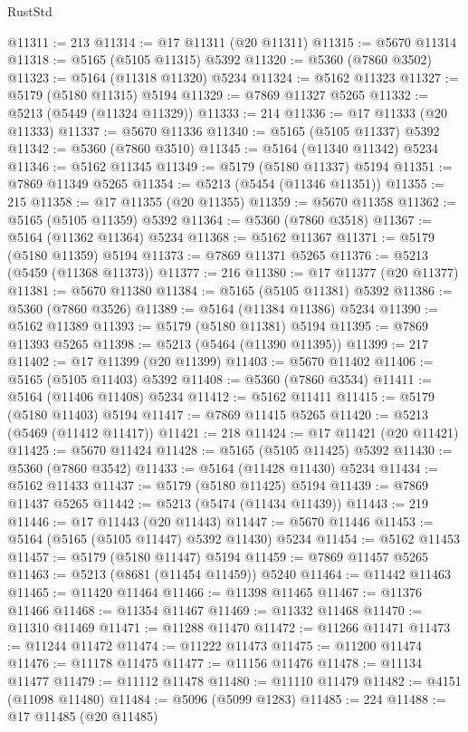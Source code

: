 \begin{lexlean}{RustStd}
\begin{coremodule}
@11311 := 213
@11314 := @17 @11311 (@20 @11311)
@11315 := @5670 @11314
@11318 := @5165 (@5105 @11315) @5392
@11320 := @5360 (@7860 @3502)
@11323 := @5164 (@11318 @11320) @5234
@11324 := @5162 @11323
@11327 := @5179 (@5180 @11315) @5194
@11329 := @7869 @11327 @5265
@11332 := @5213 (@5449 (@11324 @11329))
@11333 := 214
@11336 := @17 @11333 (@20 @11333)
@11337 := @5670 @11336
@11340 := @5165 (@5105 @11337) @5392
@11342 := @5360 (@7860 @3510)
@11345 := @5164 (@11340 @11342) @5234
@11346 := @5162 @11345
@11349 := @5179 (@5180 @11337) @5194
@11351 := @7869 @11349 @5265
@11354 := @5213 (@5454 (@11346 @11351))
@11355 := 215
@11358 := @17 @11355 (@20 @11355)
@11359 := @5670 @11358
@11362 := @5165 (@5105 @11359) @5392
@11364 := @5360 (@7860 @3518)
@11367 := @5164 (@11362 @11364) @5234
@11368 := @5162 @11367
@11371 := @5179 (@5180 @11359) @5194
@11373 := @7869 @11371 @5265
@11376 := @5213 (@5459 (@11368 @11373))
@11377 := 216
@11380 := @17 @11377 (@20 @11377)
@11381 := @5670 @11380
@11384 := @5165 (@5105 @11381) @5392
@11386 := @5360 (@7860 @3526)
@11389 := @5164 (@11384 @11386) @5234
@11390 := @5162 @11389
@11393 := @5179 (@5180 @11381) @5194
@11395 := @7869 @11393 @5265
@11398 := @5213 (@5464 (@11390 @11395))
@11399 := 217
@11402 := @17 @11399 (@20 @11399)
@11403 := @5670 @11402
@11406 := @5165 (@5105 @11403) @5392
@11408 := @5360 (@7860 @3534)
@11411 := @5164 (@11406 @11408) @5234
@11412 := @5162 @11411
@11415 := @5179 (@5180 @11403) @5194
@11417 := @7869 @11415 @5265
@11420 := @5213 (@5469 (@11412 @11417))
@11421 := 218
@11424 := @17 @11421 (@20 @11421)
@11425 := @5670 @11424
@11428 := @5165 (@5105 @11425) @5392
@11430 := @5360 (@7860 @3542)
@11433 := @5164 (@11428 @11430) @5234
@11434 := @5162 @11433
@11437 := @5179 (@5180 @11425) @5194
@11439 := @7869 @11437 @5265
@11442 := @5213 (@5474 (@11434 @11439))
@11443 := 219
@11446 := @17 @11443 (@20 @11443)
@11447 := @5670 @11446
@11453 := @5164 (@5165 (@5105 @11447) @5392 @11430) @5234
@11454 := @5162 @11453
@11457 := @5179 (@5180 @11447) @5194
@11459 := @7869 @11457 @5265
@11463 := @5213 (@8681 (@11454 @11459)) @5240
@11464 := @11442 @11463
@11465 := @11420 @11464
@11466 := @11398 @11465
@11467 := @11376 @11466
@11468 := @11354 @11467
@11469 := @11332 @11468
@11470 := @11310 @11469
@11471 := @11288 @11470
@11472 := @11266 @11471
@11473 := @11244 @11472
@11474 := @11222 @11473
@11475 := @11200 @11474
@11476 := @11178 @11475
@11477 := @11156 @11476
@11478 := @11134 @11477
@11479 := @11112 @11478
@11480 := @11110 @11479
@11482 := @4151 (@11098 @11480)
@11484 := @5096 (@5099 @1283)
@11485 := 224
@11488 := @17 @11485 (@20 @11485)

\end{coremodule}
\end{lexlean}
